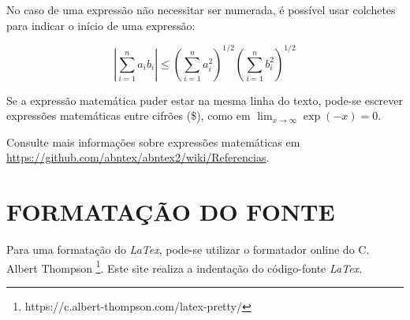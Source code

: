 No caso de uma expressão não necessitar ser numerada, é possível usar colchetes para indicar o início de uma expressão:

\[
\left|\sum_{i=1}^n a_ib_i\right|
\le
\left(\sum_{i=1}^n a_i^2\right)^{1/2}
\left(\sum_{i=1}^n b_i^2\right)^{1/2}
\]

Se a expressão matemática puder estar na mesma linha do texto, pode-se escrever expressões matemáticas entre cifrões (\$), como em $ \lim_{x \to \infty} \exp(-x) = 0 $.

Consulte mais informações sobre expressões matemáticas em
\url{https://github.com/abntex/abntex2/wiki/Referencias}.

\section{FORMATAÇÃO DO FONTE}

Para uma formatação do \textit{LaTex}, pode-se utilizar o formatador online do C. Albert Thompson  \footnote{https://c.albert-thompson.com/latex-pretty/}. Este site realiza a indentação do código-fonte \textit{LaTex}. 

